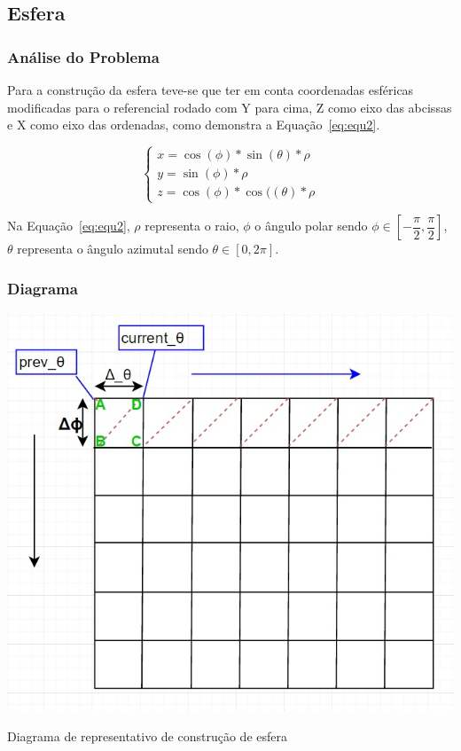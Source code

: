 \subsection{Esfera}
\subsubsection{Análise do Problema}
Para a construção da esfera teve-se que ter em conta coordenadas esféricas modificadas para o referencial rodado com Y para cima, Z como eixo das abcissas e X como eixo das ordenadas, como demonstra a Equação~\ref{eq:equ2}.


\begin{equation}
    \begin{cases}
    x = \cos(\phi) * \sin(\theta) * \rho \\
    y = \sin(\phi) * \rho \\
    z = \cos(\phi) * \cos((\theta) *\rho
    \end{cases}
\label{eq:equ2}
\end{equation}

Na Equação~\ref{eq:equ2}, $\rho$ representa o raio, $\phi$ o ângulo polar sendo $\phi \in [-\dfrac{\pi}{2}, \dfrac{\pi}{2}]$, $\theta$ representa o ângulo azimutal sendo $\theta \in [0, 2\pi]$. 


\newpage
\subsubsection{Diagrama}

\begin{center}
 	
 	\includegraphics[width=\textwidth,height=\textheight,keepaspectratio]{resources/esferaw.jpg}
 	\captionsetup{type=figure, width=0.8\linewidth}
	\caption{Diagrama de representativo de construção de esfera}
\label{fig:ssec1:Digrama Esfera} 
\end{center}


